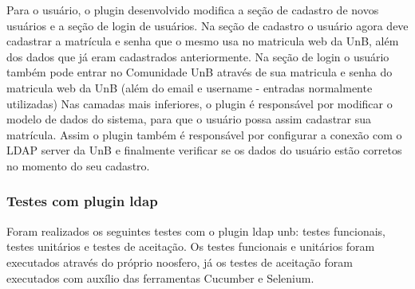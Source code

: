 %
Para o usuário, o plugin desenvolvido modifica a seção de cadastro de novos usuários 
e a seção de login de usuários. Na seção de cadastro o usuário agora deve cadastrar a 
matrícula e senha que o mesmo usa no matricula web da UnB, além dos dados que já eram 
cadastrados anteriormente. Na seção de login o usuário também pode entrar no Comunidade 
UnB através de sua matricula e senha do matricula web da UnB (além do email e username 
- entradas normalmente utilizadas)
%
Nas camadas mais inferiores, o plugin é responsável por modificar o modelo de dados do 
sistema, para que o usuário possa assim cadastrar sua matrícula. Assim o plugin também é responsável por configurar a conexão com o LDAP server da UnB e finalmente verificar se 
os dados do usuário estão corretos no momento do seu cadastro.

\subsubsection{Testes com plugin ldap}
%
Foram realizados os seguintes testes  com o plugin ldap unb: testes funcionais, testes 
unitários e testes de aceitação. Os testes funcionais e unitários foram executados através 
do próprio noosfero, já os testes de aceitação foram executados com auxílio das ferramentas Cucumber e Selenium.
%
